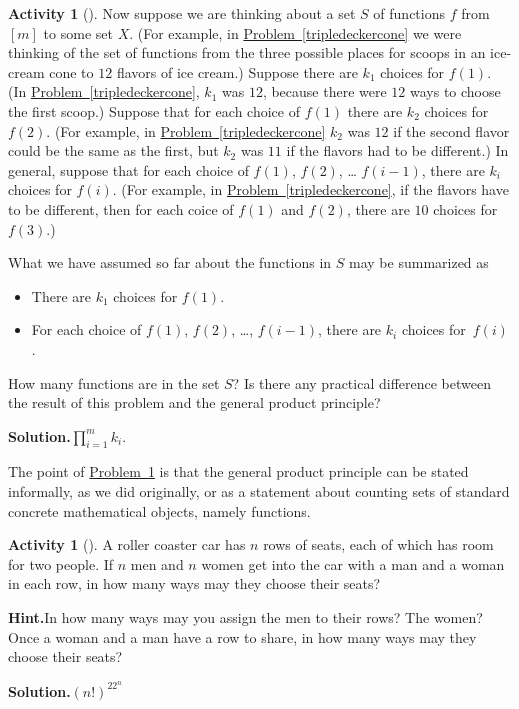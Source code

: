 \documentclass[10pt,]{book}
\theoremstyle{plain}
\theoremstyle{definition}
\newtheorem{activity}[project]{Activity}
\numberwithin{equation}{chapter}
\begin{document}
\begin{activity}[]\label{generalproductprinciple}
Now suppose we are thinking about a set \(S\) of functions \(f\) from \([m]\) to some set \(X\). (For example, in \hyperref[tripledeckercone]{Problem~\ref{tripledeckercone}} we were thinking of the set of functions from the three possible places for scoops in an ice-cream cone to \(12\) flavors of ice cream.) Suppose there are \(k_1\) choices for \(f(1)\). (In \hyperref[tripledeckercone]{Problem~\ref{tripledeckercone}}, \(k_1\) was \(12\), because there were \(12\) ways to choose the first scoop.) Suppose that for each choice of \(f(1)\) there are \(k_2\) choices for \(f(2)\). (For example, in \hyperref[tripledeckercone]{Problem~\ref{tripledeckercone}} \(k_2\) was \(12\) if the second flavor could be the same as the first, but \(k_2\) was \(11\) if the flavors had to be different.) In general, suppose that for each choice of \(f(1)\), \(f(2)\), \dots{} \(f(i-1)\), there are \(k_i\) choices for \(f(i)\). (For example, in \hyperref[tripledeckercone]{Problem~\ref{tripledeckercone}}, if the flavors have to be different, then for each coice of \(f(1)\) and \(f(2)\), there are \(10\) choices for \(f(3)\).)%
\par
What we have assumed so far about the functions in \(S\) may be summarized as \leavevmode%
\begin{itemize}[label=\textbullet]
\item{}There are \(k_1\) choices for \(f(1)\).%
\item{}For each choice of \(f(1)\), \(f(2)\), \dots{}, \(f(i-1)\), there are \(k_i\) choices for~\(f(i)\).%
\end{itemize}
%
\par
How many functions are in the set \(S\)? Is there any practical difference between the result of this problem and the general product principle?%
\par\medskip\noindent%
\textbf{Solution.}\quad \(\prod_{i=1}^m k_i\).%
\end{activity}
The point of \hyperref[generalproductprinciple]{Problem~\ref{generalproductprinciple}} is that the general product principle can be stated informally, as we did originally, or as a statement about counting sets of standard concrete mathematical objects, namely functions.%
\begin{activity}[]\label{activity-15}
A roller coaster car has \(n\) rows of seats, each of which has room for two people. If \(n\) men and \(n\) women get into the car with a man and a woman in each row, in how many ways may they choose their seats?%
\par\medskip\noindent%
\textbf{Hint.}\quad In how many ways may you assign the men to their rows? The women? Once a woman and a man have a row to share, in how many ways may they choose their seats?%
\par\medskip\noindent%
\textbf{Solution.}\quad \((n!)^22^n\)%
\end{activity}
\end{document}
